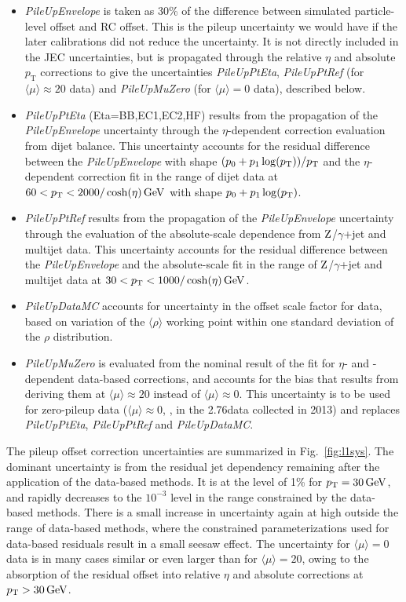 \documentclass[11pt,twoside,a4paper,cmspaper,final,collab]{cms-tdr}
\begin{document}
\begin{itemize}
\item \textit{PileUpEnvelope} is taken as 30\% of the difference between simulated particle-level offset and RC offset. This is the pileup uncertainty we would have if the later calibrations did not reduce the uncertainty. It is not directly included in the JEC uncertainties, but is propagated through the relative $\eta$ and absolute $p_\mathrm{T}$ corrections to give the uncertainties \textit{PileUpPtEta}, \textit{PileUpPtRef} (for $\langle\mu\rangle\approx 20$ data) and \textit{PileUpMuZero} (for $\langle\mu\rangle=0$ data), described below.
\item \textit{PileUpPtEta} (Eta=BB,EC1,EC2,HF) results from the propagation of the \textit{PileUpEnvelope} uncertainty through the $\eta$-dependent correction evaluation from dijet balance. This uncertainty accounts for the residual difference between the \textit{PileUpEnvelope} with shape $(p_0+p_1\log(p_{\mathrm{T}}))/p_{\mathrm{T}}$ and the $\eta$-dependent correction fit in the range of dijet data at $60<p_{\mathrm{T}}<2000/\cosh(\eta)\,\text{Ge\hspace{-.08em}V}$ with shape $p_0+p_1\log(p_{\mathrm{T}})$.
\item \textit{PileUpPtRef} results from the propagation of the \textit{PileUpEnvelope} uncertainty through the evaluation of the absolute-scale \pt dependence from $\mathrm{Z}$/$\gamma$+jet and multijet data. This uncertainty accounts for the residual difference between the \textit{PileUpEnvelope} and the absolute-scale fit in the range of $\mathrm{Z}$/$\gamma$+jet and multijet data at $30<p_{\mathrm{T}}<1000/\cosh(\eta)\,\text{Ge\hspace{-.08em}V}$.
\item \textit{PileUpDataMC} accounts for uncertainty in the offset scale factor for data, based on variation of the $\langle\rho\rangle$ working point within one standard deviation of the $\rho$ distribution.
\item \textit{PileUpMuZero} is evaluated from the nominal result of the fit for $\eta$- and \pt-dependent data-based corrections, and accounts for the bias that results from deriving them at $\langle\mu\rangle\approx 20$ instead of $\langle\mu\rangle\approx 0$. This uncertainty is to be used for zero-pileup data ($\langle\mu\rangle\approx0$, \eg, in the 2.76\TeV data collected in 2013) and replaces \textit{PileUpPtEta}, \textit{PileUpPtRef} and \textit{PileUpDataMC}.
\end{itemize}


The pileup offset correction uncertainties are summarized in Fig.~\ref{fig:l1sys}. The dominant uncertainty is from the residual jet \pt dependency remaining after the application of the data-based methods. It is at the level of 1\% for $p_{\mathrm{T}}=30\,\text{Ge\hspace{-.08em}V}$, and rapidly decreases to the $10^{-3}$ level in the range constrained by the data-based methods. There is a small increase in uncertainty again at high \pt outside the range of data-based methods, where the constrained parameterizations used for data-based residuals result in a small seesaw effect. The uncertainty for $\langle\mu\rangle=0$ data is in many cases similar or even larger than for $\langle\mu\rangle=20$, owing to the absorption of the residual offset into relative $\eta$ and absolute \pt corrections at $p_{\mathrm{T}}>30\,\text{Ge\hspace{-.08em}V}$.
\end{document}
